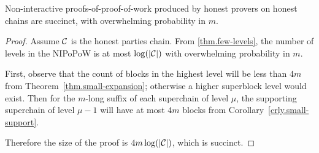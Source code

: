 \begin{theorem}
    \label{thm.succinctness}
    Non-interactive proofs-of-proof-of-work produced by honest provers on
    honest chains are succinct, with overwhelming probability in $m$.
\end{theorem}
\begin{proof}
    Assume $\mathcal{C}$ is the honest parties chain. From \ref{thm.few-levels}, the
    number of levels in the NIPoPoW is at most $\log(|\mathcal{C}|)$ with
    overwhelming probability in $m$.

    First, observe that the count of blocks in the highest level will be less
    than $4m$ from Theorem~\ref{thm.small-expansion}; otherwise a higher
    superblock level would exist. Then for the $m$-long suffix of each
    superchain of level $\mu$, the supporting superchain of level $\mu - 1$
    will have at most $4m$ blocks from Corollary~\ref{crly.small-support}.

    Therefore the size of the proof is $4m \log(|\mathcal{C}|)$, which is succinct.
\end{proof}

%
%
%
